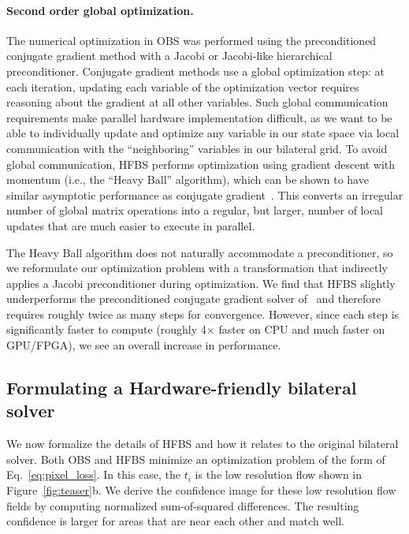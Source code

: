 \paragraph{Second order global optimization.}
The numerical optimization in OBS was performed using the preconditioned conjugate gradient method with a Jacobi or Jacobi-like hierarchical preconditioner.
Conjugate gradient methods use a global optimization step: at each iteration, updating each variable of the optimization vector requires reasoning about the gradient at all other variables.
Such global communication requirements make parallel hardware implementation difficult, as we want to be able to individually update and optimize any variable in our state space via local communication with the ``neighboring'' variables in our bilateral grid.
To avoid global communication, HFBS performs optimization using gradient descent with momentum (i.e., the ``Heavy Ball'' algorithm), which can be shown to have similar asymptotic performance as conjugate gradient~\cite{polyak1964some}.
This converts an irregular number of global matrix operations into a regular, but larger, number of local updates that are much easier to execute in parallel.

The Heavy Ball algorithm does not naturally accommodate a preconditioner, so we reformulate our optimization problem with a transformation that indirectly applies a Jacobi preconditioner during optimization.
We find that HFBS slightly underperforms the preconditioned conjugate gradient solver of~\cite{BarronPoole2016} and therefore requires roughly twice as many steps for convergence.
However, since each step is significantly faster to compute (roughly 4$\times$ faster on CPU and much faster on GPU/FPGA), we see an overall increase in performance.

\subsection{Formulating a Hardware-friendly bilateral solver}
We now formalize the details of HFBS and how it relates to the original bilateral solver. Both OBS and HFBS minimize an optimization problem of the form of Eq.~\ref{eq:pixel_loss}. In this case, the $t_i$ is the low resolution flow shown in Figure~\ref{fig:teaser}b. We derive the confidence image for these low resolution flow fields by computing normalized sum-of-squared differences.
The resulting confidence is larger for areas that are near each other and match well.

